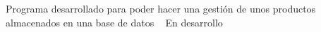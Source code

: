 Programa desarrollado para poder hacer una gestión de unos productos almacenados en una base de datos ~\newline
En desarrollo 